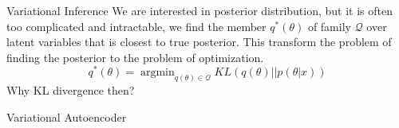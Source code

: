 \documentclass{beamer}
\newcommand{\argmin}{\mathop{\mathrm{argmin}}}
\begin{document}
\begin{frame}[allowframebreaks]{Variational Inference}
We are interested in posterior distribution, but it is often too complicated and intractable, we find the member $q^\ast(\theta)$ of family $\mathcal{Q}$ over latent variables that is closest to true posterior. This transform the problem of finding the posterior to the problem of optimization.
$$q^\ast(\theta) = \argmin_{q(\theta) \in \mathcal{Q}} KL(q(\theta) || p(\theta | x))$$
Why KL divergence then?
\end{frame}

\begin{frame}[allowframebreaks]{Variational Autoencoder}

\end{frame}
\end{document}
